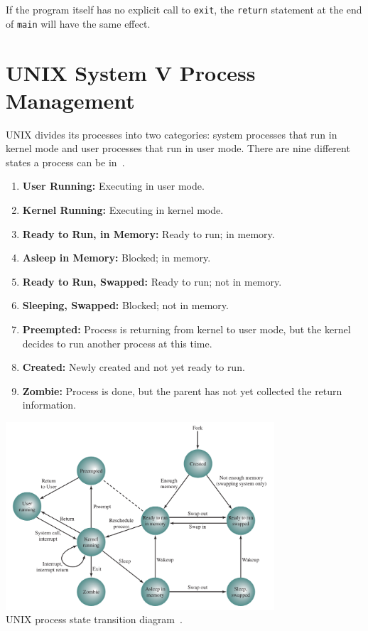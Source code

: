 If the program itself has no explicit call to \texttt{exit}, the \texttt{return} statement at the end of \texttt{main} will have the same effect.

\section*{UNIX System V Process Management}

UNIX divides its processes into two categories: system processes that run in kernel mode and user processes that run in user mode. There are nine different states a process can be in~\cite{osi}.

\begin{enumerate}
	\item \textbf{User Running:} Executing in user mode.
	\item \textbf{Kernel Running:} Executing in kernel mode.
	\item \textbf{Ready to Run, in Memory:} Ready to run; in memory.
	\item \textbf{Asleep in Memory:} Blocked; in memory.
	\item \textbf{Ready to Run, Swapped:} Ready to run; not in memory.
	\item \textbf{Sleeping, Swapped:} Blocked; not in memory.
	\item \textbf{Preempted:} Process is returning from kernel to user mode, but the kernel decides to run another process at this time.
	\item \textbf{Created:} Newly created and not yet ready to run.
	\item \textbf{Zombie:} Process is done, but the parent has not yet collected the return information.
\end{enumerate}


\begin{center}
\includegraphics[width=0.75\textwidth]{images/unix-states.png}\\
UNIX process state transition diagram~\cite{osi}.
\end{center}

